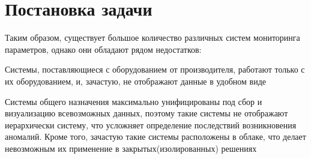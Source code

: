 \section{Постановка задачи}
Таким образом, существует большое количество различных систем мониторинга параметров, однако они обладают рядом недостатков:
\begin{itemize*}
	\item{Системы, поставляющиеся с оборудованием от производителя, работают только с их оборудованием, и, зачастую, не отображают данные в удобном виде}
	\item{Системы общего назначения максимально унифицированы под сбор и визуализацию всевозможных данных, поэтому такие системы не отображают иерархически систему, что усложняет определение последствий возникновения аномалий.  Кроме того, зачастую такие системы расположены в облаке, что делает невозможным их применение в закрытых(изолированных) решениях}
\end{itemize*}







